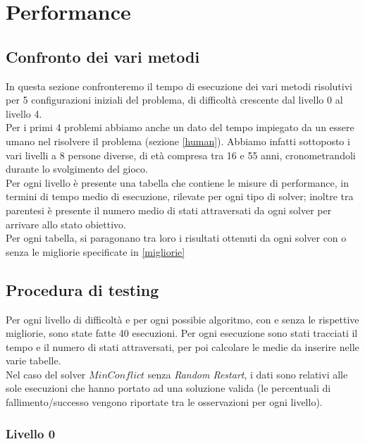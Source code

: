 
\chapter{Performance}
\label{cap:performance}
\section{Confronto dei vari metodi}
In questa sezione confronteremo il tempo di esecuzione dei vari metodi risolutivi per 5 configurazioni iniziali del problema, di difficoltà crescente dal livello 0 al livello 4.\\
Per i primi 4 problemi abbiamo anche un dato del tempo impiegato da un essere umano nel risolvere il problema (sezione \ref{human}). Abbiamo infatti sottoposto i vari livelli a 8 persone diverse, di età compresa tra 16 e 55 anni, cronometrandoli durante lo svolgimento del gioco.\\
Per ogni livello è presente una tabella che contiene le misure di performance, in termini di tempo medio di esecuzione, rilevate per ogni tipo di solver; inoltre tra parentesi è presente il numero medio di stati attraversati da ogni solver per arrivare allo stato obiettivo. \\
Per ogni tabella, si paragonano tra loro i risultati ottenuti da ogni solver con o senza le migliorie specificate in \ref{migliorie}

\section{Procedura di testing}
Per ogni livello di difficoltà e per ogni possibie algoritmo, con e senza le rispettive migliorie, sono state fatte 40 esecuzioni. Per ogni esecuzione sono stati tracciati il tempo e il numero di stati attraversati, per poi calcolare le medie da inserire nelle varie tabelle.\\
Nel caso del solver $MinConflict$ senza \textit{Random Restart}, i dati sono relativi alle sole esecuzioni che hanno portato ad una soluzione valida (le percentuali di fallimento/successo vengono riportate tra le osservazioni per ogni livello).

\newpage

\subsection{Livello 0}

